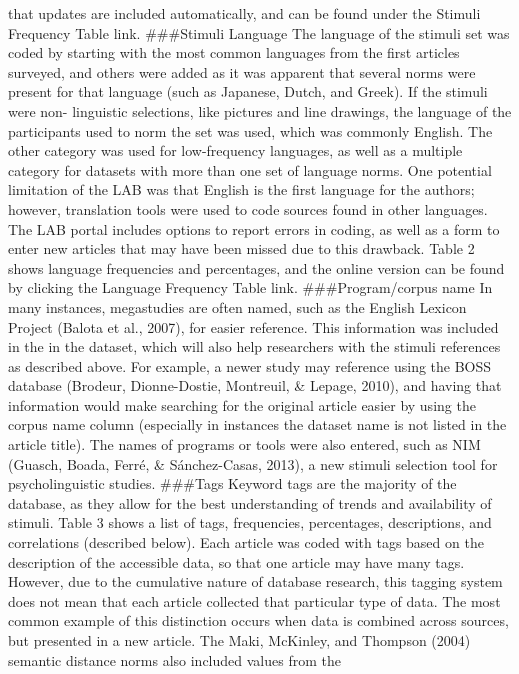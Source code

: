 \documentclass[english,man]{apa6}
\theoremstyle{definition}
\theoremstyle{definition}
\theoremstyle{definition}
\theoremstyle{remark}
\begin{document}
that updates are included automatically, and can be found under the
Stimuli Frequency Table link. \#\#\#Stimuli Language The language of the
stimuli set was coded by starting with the most common languages from
the first articles surveyed, and others were added as it was apparent
that several norms were present for that language (such as Japanese,
Dutch, and Greek). If the stimuli were non- linguistic selections, like
pictures and line drawings, the language of the participants used to
norm the set was used, which was commonly English. The other category
was used for low-frequency languages, as well as a multiple category for
datasets with more than one set of language norms. One potential
limitation of the LAB was that English is the first language for the
authors; however, translation tools were used to code sources found in
other languages. The LAB portal includes options to report errors in
coding, as well as a form to enter new articles that may have been
missed due to this drawback. Table 2 shows language frequencies and
percentages, and the online version can be found by clicking the
Language Frequency Table link. \#\#\#Program/corpus name In many
instances, megastudies are often named, such as the English Lexicon
Project (Balota et al., 2007), for easier reference. This information
was included in the in the dataset, which will also help researchers
with the stimuli references as described above. For example, a newer
study may reference using the BOSS database (Brodeur, Dionne-Dostie,
Montreuil, \& Lepage, 2010), and having that information would make
searching for the original article easier by using the corpus name
column (especially in instances the dataset name is not listed in the
article title). The names of programs or tools were also entered, such
as NIM (Guasch, Boada, Ferré, \& Sánchez-Casas, 2013), a new stimuli
selection tool for psycholinguistic studies. \#\#\#Tags Keyword tags are
the majority of the database, as they allow for the best understanding
of trends and availability of stimuli. Table 3 shows a list of tags,
frequencies, percentages, descriptions, and correlations (described
below). Each article was coded with tags based on the description of the
accessible data, so that one article may have many tags. However, due to
the cumulative nature of database research, this tagging system does not
mean that each article collected that particular type of data. The most
common example of this distinction occurs when data is combined across
sources, but presented in a new article. The Maki, McKinley, and
Thompson (2004) semantic distance norms also included values from the
\end{document}

